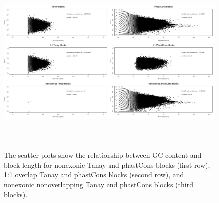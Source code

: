 \documentclass[12pt]{report}
\begin{document}
\begin{figure}[htbp]
\centering
\includegraphics[width=\textwidth, height=92mm]{all_length_vs_GC_scatterplots.jpg}
\caption{The scatter plots show the relationship between GC content and block length for nonexonic Tanay and phastCons blocks (first row), 1:1 overlap Tanay and phastCons blocks (second row), and nonexonic nonoverlapping Tanay and phastCons blocks (third blocks).}
\label{fig:scatter_all}
\end{figure}
\end{document}
